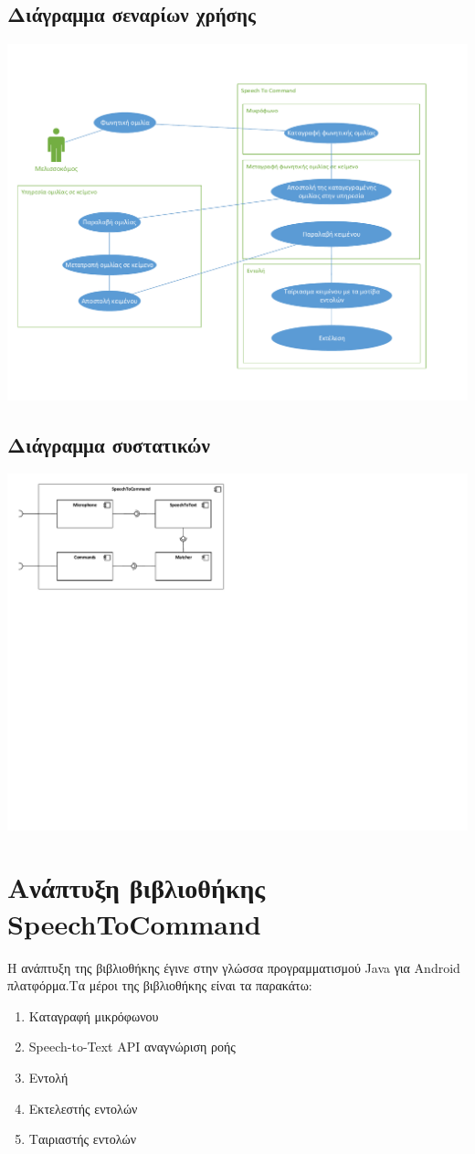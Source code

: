 \documentclass[oneside, 12pt]{book}
\begin{document}
\section{Διάγραμμα σεναρίων χρήσης}\label{sec:διάγραμμα-σεναρίων-χρήσης}
\includegraphics[scale=0.5]{uml/library_uml_use_case_diagram.pdf}
\newpage
\section{Διάγραμμα συστατικών}\label{sec:διάγραμμα-συστατικών}
\includegraphics{uml/library_uml_component_diagram.pdf}
\chapter{Ανάπτυξη βιβλιοθήκης SpeechToCommand}
Η ανάπτυξη της βιβλιοθήκης έγινε στην γλώσσα προγραμματισμού Java για Android πλατφόρμα.Τα μέροι της βιβλιοθήκης είναι τα παρακάτω:
\begin{enumerate}
  \item Καταγραφή μικρόφωνου
  \item Speech-to-Text API αναγνώριση ροής
  \item Εντολή
  \item Εκτελεστής εντολών
  \item Ταιριαστής εντολών
\end{enumerate}
\end{document}
